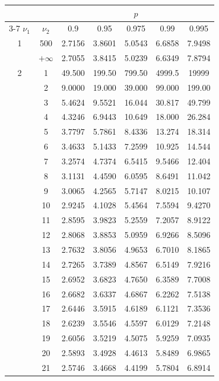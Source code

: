 \begin{minipage}{0.49\textwidth}
	\begin{center}
		\begin{tabular}{ccccccc}
			& & \multicolumn{5}{c}{$p$}\\
			\cline{3-7}
			$\nu_1$ & $\nu_2$ & 0.9 & 0.95 & 0.975 & 0.99 & 0.995 \\
			\midrule
			1 & 500 & 2.7156 & 3.8601 & 5.0543 & 6.6858 & 7.9498 \\
			& $+\infty$ & 2.7055 & 3.8415 & 5.0239 & 6.6349 & 7.8794 \\
			\midrule
			2 & 1 & 49.500 & 199.50 & 799.50 & 4999.5 & 19999 \\
			& 2 & 9.0000 & 19.000 & 39.000 & 99.000 & 199.00 \\
			& 3 & 5.4624 & 9.5521 & 16.044 & 30.817 & 49.799 \\
			& 4 & 4.3246 & 6.9443 & 10.649 & 18.000 & 26.284 \\
			& 5 & 3.7797 & 5.7861 & 8.4336 & 13.274 & 18.314 \\
			& 6 & 3.4633 & 5.1433 & 7.2599 & 10.925 & 14.544 \\
			& 7 & 3.2574 & 4.7374 & 6.5415 & 9.5466 & 12.404 \\
			& 8 & 3.1131 & 4.4590 & 6.0595 & 8.6491 & 11.042 \\
			& 9 & 3.0065 & 4.2565 & 5.7147 & 8.0215 & 10.107 \\[5pt]
			& 10 & 2.9245 & 4.1028 & 5.4564 & 7.5594 & 9.4270 \\
			& 11 & 2.8595 & 3.9823 & 5.2559 & 7.2057 & 8.9122 \\
			& 12 & 2.8068 & 3.8853 & 5.0959 & 6.9266 & 8.5096 \\
			& 13 & 2.7632 & 3.8056 & 4.9653 & 6.7010 & 8.1865 \\
			& 14 & 2.7265 & 3.7389 & 4.8567 & 6.5149 & 7.9216 \\
			& 15 & 2.6952 & 3.6823 & 4.7650 & 6.3589 & 7.7008 \\
			& 16 & 2.6682 & 3.6337 & 4.6867 & 6.2262 & 7.5138 \\
			& 17 & 2.6446 & 3.5915 & 4.6189 & 6.1121 & 7.3536 \\
			& 18 & 2.6239 & 3.5546 & 4.5597 & 6.0129 & 7.2148 \\
			& 19 & 2.6056 & 3.5219 & 4.5075 & 5.9259 & 7.0935 \\[5pt]
			& 20 & 2.5893 & 3.4928 & 4.4613 & 5.8489 & 6.9865 \\
			& 21 & 2.5746 & 3.4668 & 4.4199 & 5.7804 & 6.8914 \\

\end{tabular}
\end{center}
\end{minipage}
